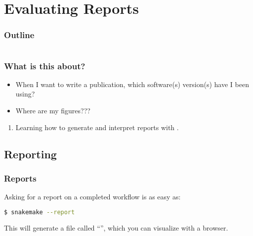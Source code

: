 \section{Evaluating Reports}

\begin{frame}
    \frametitle{Outline}
    \begin{columns}[t]
        \begin{column}{.5\textwidth}
            \tableofcontents[sections={1-7},currentsection]
        \end{column}
        \begin{column}{.5\textwidth}
            \tableofcontents[sections={8-15},currentsection]
        \end{column}
    \end{columns}
\end{frame}

\begin{frame}
  \frametitle{What is this about?}
   \begin{question}[Questions]
   	 \begin{itemize}
        \item When I want to write a publication, which software(s) version(s) have I been using?
        \item Where are my figures???
     \end{itemize}
   \end{question}
   \begin{docs}[Objectives]
   	  \begin{enumerate}
         \item Learning how to generate and interpret reports with \Snakemake{}.
      \end{enumerate}
  \end{docs}
\end{frame}

\subsection{Reporting}

\begin{frame}[fragile]
  \frametitle{\Snakemake{} Reports}
  Asking \Snakemake{} for a report on a completed workflow is as easy as:
  \begin{lstlisting}[language=Bash, style=Shell]
$ snakemake --report
  \end{lstlisting}
  This will generate a file called ``'', which you can visualize with a browser.
\end{frame} 


